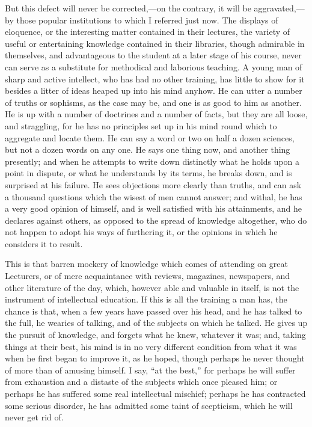 But this defect will never be corrected,—on the contrary, it will
be aggravated,—by those popular institutions to which I referred
just now. The displays of eloquence, or the interesting matter
contained in their lectures, the variety of useful or entertaining
knowledge contained in their libraries, though admirable in
themselves, and advantageous to the student at a later stage of his
course, never can serve as a substitute for methodical and laborious
teaching. A young man of sharp and active intellect, who has had no
other training, has little to show for it besides a litter of
ideas heaped up into his mind anyhow. He can utter a number of truths
or sophisms, as the case may be, and one is as good to him as another.
He is up with a number of doctrines and a number of facts, but they
are all loose, and straggling, for he has no principles set up in his
mind round which to aggregate and locate them. He can say a word or
two on half a dozen sciences, but not a dozen words on any one. He
says one thing now, and another thing presently; and when he attempts
to write down distinctly what he holds upon a point in dispute, or
what he understands by its terms, he breaks down, and is surprised at
his failure. He sees objections more clearly than truths, and can ask
a thousand questions which the wisest of men cannot answer; and
withal, he has a very good opinion of himself, and is well satisfied
with his attainments, and he declares against others, as opposed to
the spread of knowledge altogether, who do not happen to adopt his
ways of furthering it, or the opinions in which he considers it to
result.

This is that barren mockery of knowledge which comes of attending
on great Lecturers, or of mere acquaintance with reviews, magazines,
newspapers, and other literature of the day, which, however able and
valuable in itself, is not the instrument of intellectual education.
If this is all the training a man has, the chance is that, when a few
years have passed over his head, and he has talked to the full, he
wearies of talking, and of the subjects on which he talked. He gives
up the pursuit of knowledge, and forgets what he knew, whatever it
was; and, taking things at their best, his mind is in no very
different condition from what it was when he first began to improve
it, as he hoped, though perhaps he never thought of more than of
amusing himself. I say, ``at the best,'' for perhaps he will
suffer from exhaustion and a distaste of the subjects which once
pleased him; or perhaps he has suffered some real intellectual
mischief; perhaps he has contracted some serious disorder, he has
admitted some taint of scepticism, which he will never get rid of.

